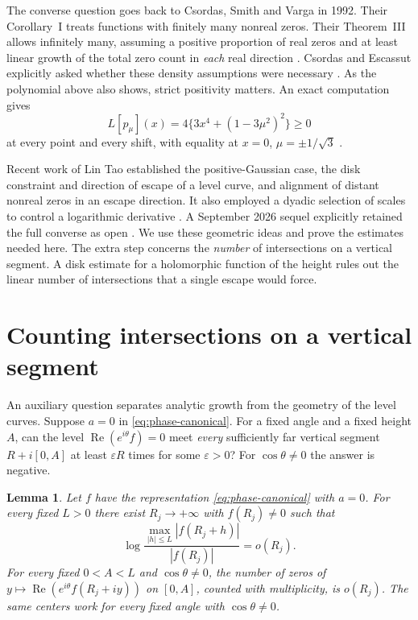 \documentclass[11pt,a4paper]{article}
\newtheorem{lemma}[theorem]{Lemma}
\numberwithin{equation}{section}
\renewcommand{\Re}{\operatorname{Re}}\renewcommand{\Im}{\operatorname{Im}}
\begin{document}
The converse question goes back to Csordas, Smith and Varga in 1992.
Their Corollary~I treats functions with finitely many nonreal zeros.
Their Theorem~III allows infinitely many, assuming a positive proportion
of real zeros and at least linear growth of the total zero count in
\emph{each} real direction \cite{CSV}. Csordas and Escassut explicitly
asked whether these density assumptions were necessary
\cite[Remark~3.6]{CE}. As the polynomial above also shows,
strict positivity matters. An exact computation gives
\[
       L[p_\mu](x)=4\{3x^4+(1-3\mu^2)^2\}\ge0
\]
at every point and every shift, with equality at $x=0$,
$\mu=\pm1/\sqrt{3}$ \cite[Remark~3.6]{CE}.

Recent work of Lin Tao established the positive-Gaussian case, the disk
constraint and direction of escape of a level curve, and alignment of
distant nonreal zeros in an escape direction. It also employed a dyadic
selection of scales to control a logarithmic derivative
\cite[Lemma~3.1, Theorem~3.2, Lemma~5.1, Theorem~16.4]{Lin1}.
A September 2026 sequel explicitly retained the full converse as open
\cite[\S11.5, Open E]{Lin2}. We use these geometric ideas and prove the
estimates needed here. The extra step concerns the \emph{number} of
intersections on a vertical segment. A disk estimate for a holomorphic
function of the height rules out the linear number of intersections
that a single escape would force.

\section{Counting intersections on a vertical segment}\label{sec:sparse}
An auxiliary question separates analytic growth from the geometry of the
level curves. Suppose $a=0$ in \eqref{eq:phase-canonical}. For a fixed
angle and a fixed height $A$, can the level
$\Re(e^{i\theta}f)=0$ meet \emph{every} sufficiently far vertical segment
$R+i[0,A]$ at least $\varepsilon R$ times for some $\varepsilon>0$?
For $\cos\theta\ne0$ the answer is negative.

\begin{lemma}\label{lem:sparse}
Let $f$ have the representation \eqref{eq:phase-canonical} with $a=0$.
For every fixed $L>0$ there exist $R_j\to+\infty$ with $f(R_j)\ne0$
such that
\[
 \log\frac{\max_{|h|\le L}|f(R_j+h)|}{|f(R_j)|}=o(R_j).
\]
For every fixed $0<A<L$ and $\cos\theta\ne0$, the number of zeros
of $y\mapsto\Re(e^{i\theta}f(R_j+iy))$ on $[0,A]$, counted with
multiplicity, is $o(R_j)$. The same centers work for every fixed
angle with $\cos\theta\ne0$.
\end{lemma}
\end{document}

